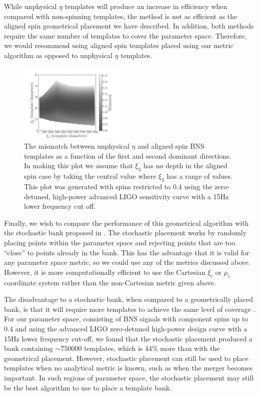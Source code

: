 While unphysical $\eta$ templates will produce an increase in efficiency when compared with non-spinning templates, the
method is not as efficient as the aligned spin geometrical placement we have described. In addition, both methods
require the same number of templates to cover the parameter space. Therefore, we would recommend using aligned spin templates
placed using our metric algorithm as opposed to unphysical $\eta$ templates.

\begin{figure}
\includegraphics[width=0.45\textwidth]{papers/bns_spin/figure9.png} 
\caption{\label{fig:unphys_eta} The mismatch between unphysical $\eta$ and
aligned spin BNS templates as a function of the first and second dominant
directions. In making this plot we assume that $\xi_3$
has no depth in the aligned spin case by taking the central value where $\xi_3$ has a range of values.
This plot was generated
with spins restricted to 0.4 using the zero-detuned, high-power advanced LIGO
sensitivity curve with a 15Hz lower frequency cut off. 
}
\end{figure}

Finally, we wish to compare the performance of this geometrical algorithm with the stochastic bank proposed in
\cite{Harry:2009ea,Babak:2008rb}. The stochastic placement works by randomly placing points within the parameter
space and rejecting points that are too ``close'' to points already in the bank. This
has the advantage that it is valid for any parameter space metric, so we could use any of the metrics discussed
above. However, it is more computationally efficient to use the Cartesian $\xi_i$ or $\mu_i$ coordinate system
rather than the non-Cartesian metric given above.

The disadvantage to a stochastic bank, when compared to a geometrically placed bank, is that it will require more
templates to achieve the same level of coverage \cite{Harry:2009ea,Manca:2009xw}.
For our parameter space, consisting of BNS signals with
component spins up to 0.4 and using the advanced LIGO zero-detuned high-power design curve with a 15Hz lower
frequency cut-off,
we found that the stochastic placement
produced a bank containing $\sim 750000$ templates, which is 44\% more than with the geometrical placement.
However, stochastic placement can still be used to place templates when no analytical metric is known, such
as when the merger becomes important. In such regions of parameter space, the stochastic placement may still be the best
algorithm to use to place a template bank.

